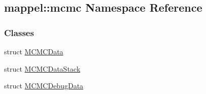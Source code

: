 \hypertarget{namespacemappel_1_1mcmc}{}\subsection{mappel\+:\+:mcmc Namespace Reference}
\label{namespacemappel_1_1mcmc}
\subsubsection*{Classes}
\begin{DoxyCompactItemize}
\item 
struct \hyperlink{structmappel_1_1mcmc_1_1MCMCData}{M\+C\+M\+C\+Data}
\item 
struct \hyperlink{structmappel_1_1mcmc_1_1MCMCDataStack}{M\+C\+M\+C\+Data\+Stack}
\item 
struct \hyperlink{structmappel_1_1mcmc_1_1MCMCDebugData}{M\+C\+M\+C\+Debug\+Data}
\end{DoxyCompactItemize}
